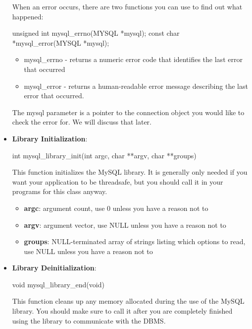 \documentclass{report}
\begin{document}
\begin{itemize}
            \bigbreak \noindent 
            When an error occurs, there are two functions you can use to find out what happened:
            \bigbreak \noindent 
            \begin{cppcode}
            unsigned int mysql_errno(MYSQL *mysql);
            const char *mysql_error(MYSQL *mysql);
            \end{cppcode}
            \bigbreak \noindent 
            \begin{itemize}
                \item mysql\_errno - returns a numeric error code that identifies the last error that occurred
                \item mysql\_error - returns a human-readable error message describing the last error that occurred.
            \end{itemize}
            The mysql parameter is a pointer to the connection object you would like to check the error for. We will discuss that later.
        \item \textbf{Library Initialization}: 
            \bigbreak \noindent 
            \begin{cppcode}
                int mysql_library_init(int argc, char **argv, char **groups)
            \end{cppcode}
            \bigbreak \noindent 
            This function initializes the MySQL library. It is generally only needed if you want your application to be
            threadsafe, but you should call it in your programs for this class anyway.
            \begin{itemize}
                \item \textbf{argc}: argument count, use 0 unless you have a reason not to
                \item \textbf{argv}: argument vector, use NULL unless you have a reason not to
                \item \textbf{groups}: NULL-terminated array of strings listing which options to read, use NULL unless you have a reason not to
            \end{itemize}
        \item \textbf{Library Deinitialization}:
            \bigbreak \noindent 
            \begin{cppcode}
                void mysql_library_end(void)
            \end{cppcode}
            \bigbreak \noindent 
            This function cleans up any memory allocated during the use of the MySQL library. You should make sure to call it after you are completely finished using the library to communicate with the DBMS.

\end{itemize}
\end{document}
